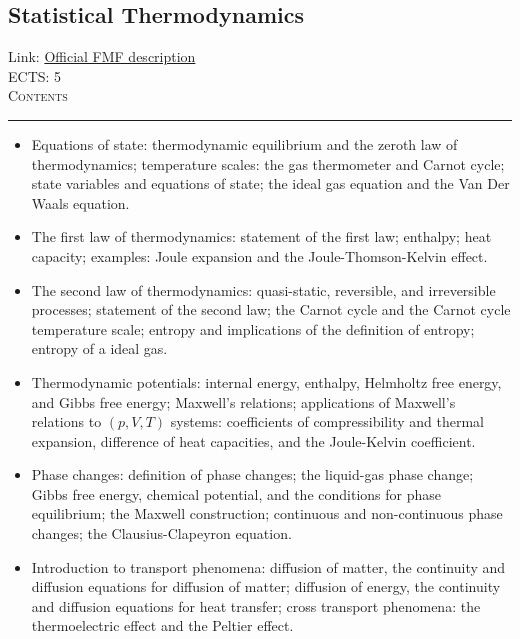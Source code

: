 \documentclass[11pt, a4paper]{article}
\newenvironment{course}[3]{
\subsection{#1}%
Link: \href{#2}{Official FMF description}\\%
ECTS: #3%
\vspace{1ex}
\\
{\large \textsc{Contents}}\\[-0.9ex]%
\rule{\textwidth}{0.5pt}
\vspace{-3ex}
}
{}
\newenvironment{chapter}[1]{
\begin{tcolorbox}[title=#1, breakable]
}
{\end{tcolorbox}}
\begin{document}
\begin{course}{Statistical Thermodynamics}{https://www.fmf.uni-lj.si/en/study-physics/programmes/1fiz/2020/7000777/courses/1174/}{5}
    \label{statistical_thermodynamics}

    \begin{chapter}{Part 1: Classical thermodynamics}
        \begin{itemize}
            \item Equations of state: thermodynamic equilibrium and the zeroth law of thermodynamics; temperature scales: the gas thermometer and Carnot cycle; state variables and equations of state; the ideal gas equation and the Van Der Waals equation.

            \item The first law of thermodynamics: statement of the first law; enthalpy; heat capacity; examples: Joule expansion and the Joule-Thomson-Kelvin effect.

            \item The second law of thermodynamics: quasi-static, reversible, and irreversible processes; statement of the second law; the Carnot cycle and the Carnot cycle temperature scale; entropy and implications of the definition of entropy; entropy of a ideal gas.

            \item Thermodynamic potentials: internal energy, enthalpy, Helmholtz free energy, and Gibbs free energy; Maxwell's relations; applications of Maxwell's relations to $ (p, V, T) $ systems: coefficients of compressibility and thermal expansion, difference of heat capacities, and the Joule-Kelvin coefficient.

            \item Phase changes: definition of phase changes; the liquid-gas phase change; Gibbs free energy, chemical potential, and the conditions for phase equilibrium; the Maxwell construction; continuous and non-continuous phase changes; the Clausius-Clapeyron equation.

            \item Introduction to transport phenomena: diffusion of matter, the continuity and diffusion equations for diffusion of matter; diffusion of energy, the continuity and diffusion equations for heat transfer; cross transport phenomena: the thermoelectric effect and the Peltier effect.
            
        \end{itemize}
    \end{chapter}


\end{course}
\end{document}
